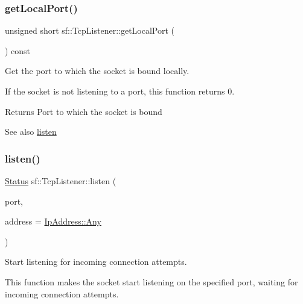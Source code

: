\subsubsection{\texorpdfstring{getLocalPort()}{getLocalPort()}}
{\footnotesize\ttfamily unsigned short sf\+::\+Tcp\+Listener\+::get\+Local\+Port (\begin{DoxyParamCaption}{ }\end{DoxyParamCaption}) const}



Get the port to which the socket is bound locally. 

If the socket is not listening to a port, this function returns 0.

\begin{DoxyReturn}{Returns}
Port to which the socket is bound
\end{DoxyReturn}
\begin{DoxySeeAlso}{See also}
\mbox{\hyperlink{classsf_1_1_tcp_listener_a9504758ea3570e62cb20b209c11776a1}{listen}} \begin{DoxyVerb}\end{DoxyVerb}
 
\end{DoxySeeAlso}
\mbox{\label{classsf_1_1_tcp_listener_a9504758ea3570e62cb20b209c11776a1}} 
\subsubsection{\texorpdfstring{listen()}{listen()}}
{\footnotesize\ttfamily \mbox{\hyperlink{classsf_1_1_socket_a51bf0fd51057b98a10fbb866246176dc}{Status}} sf\+::\+Tcp\+Listener\+::listen (\begin{DoxyParamCaption}\item[{unsigned short}]{port,  }\item[{const \mbox{\hyperlink{classsf_1_1_ip_address}{Ip\+Address}} \&}]{address = {\ttfamily \mbox{\hyperlink{classsf_1_1_ip_address_a3dbc10b0dc6804cc69e29342f7406907}{Ip\+Address\+::\+Any}}} }\end{DoxyParamCaption})}



Start listening for incoming connection attempts. 

This function makes the socket start listening on the specified port, waiting for incoming connection attempts.

